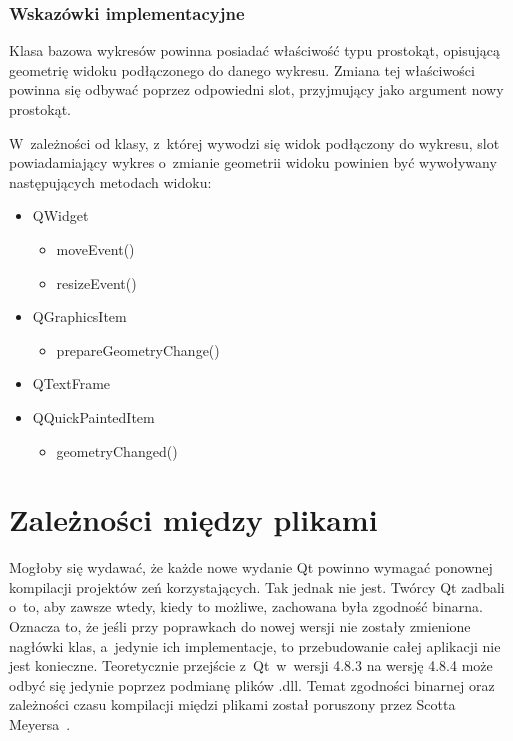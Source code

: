 \subsubsection{Wskazówki implementacyjne}
Klasa bazowa wykresów powinna posiadać właściwość typu prostokąt, opisującą geometrię widoku podłączonego do danego wykresu. Zmiana tej właściwości powinna się odbywać poprzez odpowiedni slot, przyjmujący jako argument nowy prostokąt.

W~zależności od klasy, z~której wywodzi się widok podłączony do wykresu, slot powiadamiający wykres o~zmianie geometrii widoku powinien być wywoływany następujących metodach widoku:
\begin{itemize}
\item{QWidget}
	\begin{itemize}
	\item{moveEvent()}
	\item{resizeEvent()}
	\end{itemize}
\item{QGraphicsItem}
	\begin{itemize}
	\item{prepareGeometryChange()}
	\end{itemize}
\item{QTextFrame}

\item{QQuickPaintedItem}
	\begin{itemize}
	\item{geometryChanged()}
	\end{itemize}
\end{itemize}

\section{Zależności między plikami}
Mogłoby się wydawać, że każde nowe wydanie Qt powinno wymagać ponownej kompilacji projektów zeń korzystających. Tak jednak nie jest. Twórcy Qt zadbali o~to, aby zawsze wtedy, kiedy to możliwe, zachowana była zgodność binarna. Oznacza to, że jeśli przy poprawkach do nowej wersji nie zostały zmienione nagłówki klas, a~jedynie ich implementacje, to przebudowanie całej aplikacji nie jest konieczne. Teoretycznie przejście z~Qt~w~wersji 4.8.3 na wersję 4.8.4 może odbyć się jedynie poprzez podmianę plików .dll. Temat zgodności binarnej oraz zależności czasu kompilacji międzi plikami został poruszony przez Scotta Meyersa~\cite[150-158]{50Ways}.

